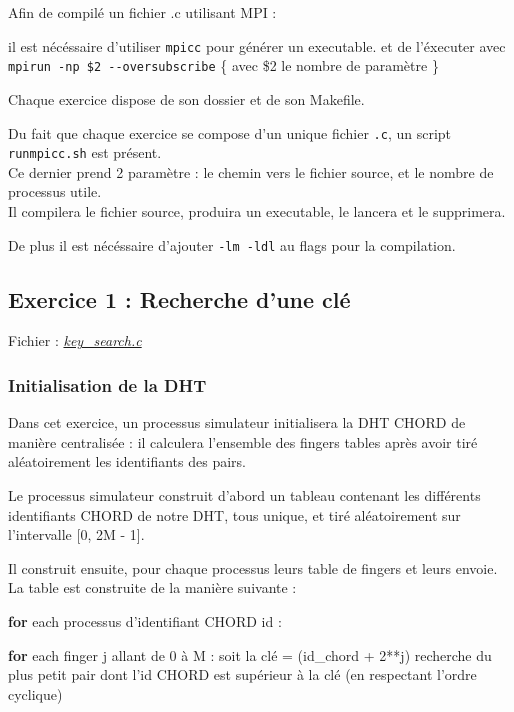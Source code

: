 \documentclass[
]{article}
\newenvironment{Shaded}{}{}
\newcommand{\BuiltInTok}[1]{#1}
\newcommand{\ControlFlowTok}[1]{\textcolor[rgb]{0.00,0.44,0.13}{\textbf{#1}}}
\newcommand{\DecValTok}[1]{\textcolor[rgb]{0.25,0.63,0.44}{#1}}
\newcommand{\NormalTok}[1]{#1}
\newcommand{\OperatorTok}[1]{\textcolor[rgb]{0.40,0.40,0.40}{#1}}
\begin{document}
Afin de compilé un fichier .c utilisant MPI :

il est nécéssaire d'utiliser \texttt{mpicc} pour générer un executable.
et de l'éxecuter avec \texttt{mpirun\ -np\ \$2\ -\/-oversubscribe} \{
avec \$2 le nombre de paramètre \}

Chaque exercice dispose de son dossier et de son Makefile.

Du fait que chaque exercice se compose d'un unique fichier \texttt{.c},
un script \texttt{runmpicc.sh} est présent.\\
Ce dernier prend 2 paramètre : le chemin vers le fichier source, et le
nombre de processus utile.\\
Il compilera le fichier source, produira un executable, le lancera et le
supprimera.

De plus il est nécéssaire d'ajouter \texttt{-lm\ -ldl} au flags pour la
compilation.

\hypertarget{exercice-1-recherche-dune-cluxe9}{%
\subsection{Exercice 1 : Recherche d'une
clé}\label{exercice-1-recherche-dune-cluxe9}}

Fichier : \href{Exercice_1/src/key_search.c}{\emph{key\_search.c}}

\hypertarget{initialisation-de-la-dht}{%
\subsubsection{Initialisation de la
DHT}\label{initialisation-de-la-dht}}

Dans cet exercice, un processus simulateur initialisera la DHT CHORD de
manière centralisée : il calculera l'ensemble des fingers tables après
avoir tiré aléatoirement les identifiants des pairs.

Le processus simulateur construit d'abord un tableau contenant les
différents identifiants CHORD de notre DHT, tous unique, et tiré
aléatoirement sur l'intervalle {[}0, 2M - 1{]}.

Il construit ensuite, pour chaque processus leurs table de fingers et
leurs envoie. La table est construite de la manière suivante :

\begin{Shaded}
\begin{Highlighting}[]
\ControlFlowTok{for}\NormalTok{ each processus d’identifiant CHORD }\BuiltInTok{id}\NormalTok{ :}

  \ControlFlowTok{for}\NormalTok{ each finger j allant de }\DecValTok{0}\NormalTok{ à M :}
\NormalTok{      soit la clé }\OperatorTok{=}\NormalTok{ (id\_chord }\OperatorTok{+} \DecValTok{2}\OperatorTok{**}\NormalTok{j)}
\NormalTok{      recherche du plus petit pair dont l’id CHORD est supérieur à la clé }
\NormalTok{                                       (en respectant l’ordre cyclique)}
\end{Highlighting}
\end{Shaded}
\end{document}
